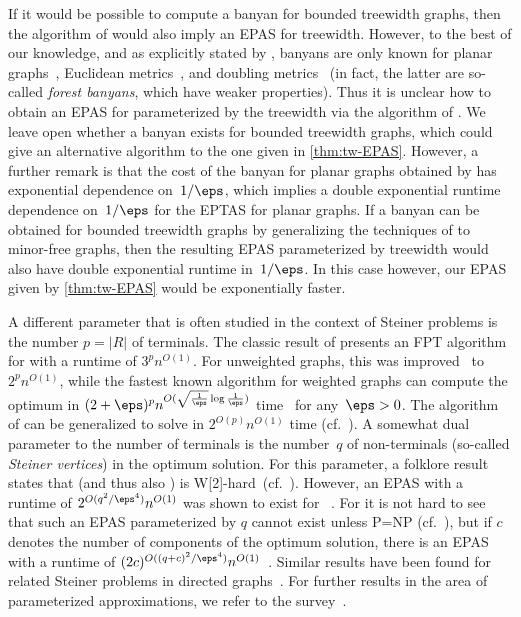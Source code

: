 If it would be possible to compute a banyan for bounded treewidth graphs, then the algorithm of \citet{eisenstat2012efficient} would also imply an EPAS for treewidth. However, to the best of our knowledge, and as explicitly stated by \citet{bartal2021near}, banyans are only known for planar graphs~\cite{eisenstat2012efficient, borradaile2009n}, Euclidean metrics~\cite{rao1998approximating}, and doubling metrics~\cite{bartal2021near} (in fact, the latter are so-called \emph{forest banyans}, which have weaker properties). Thus it is unclear how to obtain an EPAS for \SF parameterized by the treewidth via the algorithm of \citet{eisenstat2012efficient}. We leave open whether a banyan exists for bounded treewidth graphs, which could give an alternative algorithm to the one given in \autoref{thm:tw-EPAS}. However, a further remark is that the cost of the banyan for planar graphs obtained by \citet{borradaile2009n} has exponential dependence on~$1/\eps$, which implies a double exponential runtime dependence on~$1/\eps$ for the EPTAS for planar graphs. If a banyan can be obtained for bounded treewidth graphs by generalizing the techniques of \citet{borradaile2009n} to minor-free graphs, then the resulting EPAS parameterized by treewidth would also have double exponential runtime in~$1/\eps$. In this case however, our EPAS given by \autoref{thm:tw-EPAS} would be exponentially faster.

A different parameter that is often studied in the context of Steiner problems 
is the number $p=|R|$ of terminals. The classic result of 
\citet{dreyfus1971steiner} presents an FPT algorithm for \ST with a runtime of 
$3^p n^{O(1)}$. For unweighted graphs, this was 
improved~\cite{bjorklund2007fourier, nederlof2009fast} to $2^p n^{O(1)}$, while 
the fastest known algorithm for weighted graphs can compute the optimum in 
$(2+\eps)^p n^{O(\sqrt{\frac{1}{\eps}}\log\frac{1}{\eps})}$ 
time~\cite{fuchs2007dynamic} for any~$\eps>0$. The algorithm of 
\citet{dreyfus1971steiner} can be generalized to solve \SF in $2^{O(p)} 
n^{O(1)}$ time (cf.~\cite{chitnis2021parameterized}). A somewhat dual parameter 
to the number of terminals is the number~$q$ of non-terminals (so-called 
\emph{Steiner vertices}) in the optimum solution. For this parameter, a folklore 
result states that \ST (and thus also \SF) is 
W[2]-hard~(cf.~\cite{cygan2015parameterized, dvorak2021parameterized}). However, 
an EPAS with a runtime of $2^{O(q^2/\eps^4)}n^{O(1)}$ was shown to exist for 
\ST~\cite{dvorak2021parameterized}. For \SF it is not hard to see that such an 
EPAS parameterized by $q$ cannot exist unless P=NP 
(cf.~\cite{dvorak2021parameterized}), but if $c$ denotes the number of 
components of the optimum solution, there is an EPAS with a runtime of 
$(2c)^{O((q+c)^2/\eps^4)}n^{O(1)}$~\cite{dvorak2021parameterized}. Similar 
results have been found for related Steiner problems in directed 
graphs~\cite{chitnis2021parameterized}. For further results in the area of 
parameterized approximations, we refer to the survey~\cite{feldmann2020survey}.
